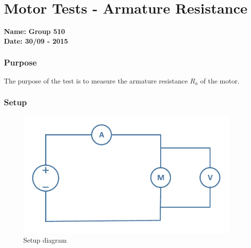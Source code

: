 \pagebreak
\section{Motor Tests - Armature Resistance} \label{app:motorTestArmatureResistance}
\textbf{Name: Group 510}\\
\textbf{Date: 30/09 - 2015}

\subsubsection{Purpose}
The purpose of the test is to measure the armature resistance $R_a$ of the motor.

\subsubsection{Setup}
\begin{figure}[H]
  \centering
	\includegraphics[scale=0.5]{figures/MotorTest1.pdf}
	\caption{Setup diagram}
\end{figure}\vspace{-5mm}

